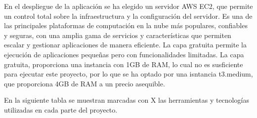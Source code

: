 En el despliegue de la aplicación se ha elegido un servidor AWS EC2, que permite un control total sobre la infraestructura y la configuración del servidor. Es una de las principales plataformas de computación en la nube más populares, confiables y seguras, con una amplia gama de servicios y características que permiten escalar y gestionar aplicaciones de manera eficiente. La capa gratuita permite la ejecución de aplicaciones pequeñas pero con funcionalidades limitadas. La capa gratuita, proporciona una instancia con 1GB de RAM, lo cual no es susficiente para ejecutar este proyecto, por lo que se ha optado por una isntancia t3.medium, que proporciona 4GB de RAM a un precio asequible.

En la siguiente tabla se muestran marcadas con X las herramientas y tecnologías utilizadas en cada parte del proyecto. 
